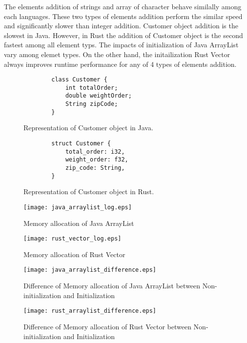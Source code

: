 The elements addition of strings and array of character behave similally among each languages. These two types of elements addition perform the similar speed and significantly slower than integer addition. 
Customer object addition is the slowest in Java. However, in Rust the addition of Customer object is the second fastest among all element typs.
The impacts of initialization of Java ArrayList vary among elemet types. On the other hand, the initailization Rust Vector always improves runtime performance for any of 4 types of elements addition.


\begin{figure}[htb]
    \begin{lstlisting}
        class Customer {
            int totalOrder;
            double weightOrder;
            String zipCode;
        }
    \end{lstlisting}
    \caption{Representation of Customer object in Java.}
    \label{fig:Sampling}    
\end{figure}

\begin{figure}[htb]
    \begin{lstlisting}
        struct Customer {
            total_order: i32,
            weight_order: f32,
            zip_code: String,
        }
    \end{lstlisting}
    \caption{Representation of Customer object in Rust.}
    \label{fig:Sampling}
\end{figure}

\begin{figure}[htb]
    \texttt{[image: java\_arraylist\_log.eps]}
    \caption{Memory allocation of Java ArrayList}
    \label{fig:Sampling}
\end{figure}

\begin{figure}[htb]
    \texttt{[image: rust\_vector\_log.eps]}
    \caption{Memory allocation of Rust Vector}
    \label{fig:Sampling}
\end{figure}


\begin{figure}[htb]
    \texttt{[image: java\_arraylist\_difference.eps]}
    \caption{Difference of Memory allocation of Java ArrayList between Non-initialization and Initialization}
    \label{fig:Sampling}
\end{figure}

\begin{figure}[htb]
    \texttt{[image: rust\_arraylist\_difference.eps]}
    \caption{Difference of Memory allocation of Rust Vector between Non-initialization and Initialization}
    \label{fig:Sampling}
\end{figure}


